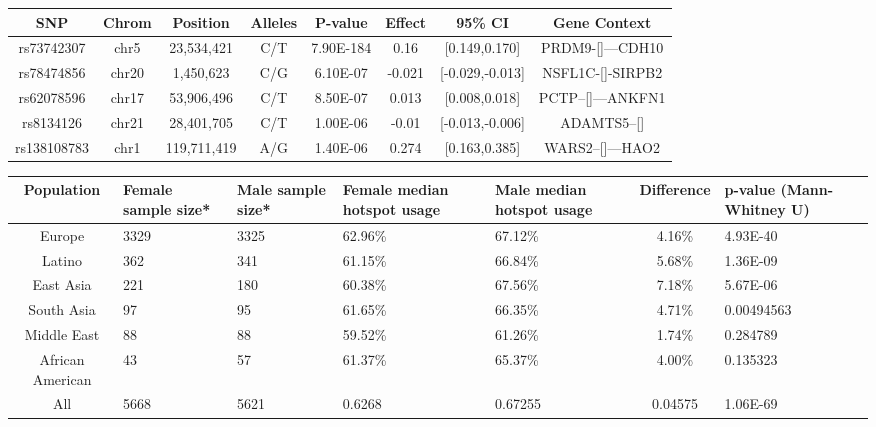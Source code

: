 \clearpage 

\mbox{} \vspace{3cm}
\begin{table}[h] \centering
    \footnotesize
    \begin{tabular}{|cccccccc|}
        \hline 
SNP & Chrom & Position & Alleles & P-value & Effect & 95\% CI & Gene Context \\ \hline
rs73742307 & chr5 & 23,534,421 & C/T & 7.90E-184 & 0.16 & [0.149,0.170] & PRDM9-[]---CDH10 \\
rs78474856 & chr20 & 1,450,623 & C/G & 6.10E-07 & -0.021 & [-0.029,-0.013] & NSFL1C-[]-SIRPB2 \\
rs62078596 & chr17 & 53,906,496 & C/T & 8.50E-07 & 0.013 & [0.008,0.018] & PCTP--[]---ANKFN1 \\
rs8134126 & chr21 & 28,401,705 & C/T & 1.00E-06 & -0.01 & [-0.013,-0.006] & ADAMTS5--[] \\
rs138108783 & chr1 & 119,711,419 & A/G & 1.40E-06 & 0.274 & [0.163,0.385] & WARS2--[]---HAO2 \\
    \hline \end{tabular}
\end{table}

\vspace{2cm}
\begin{table}[!h] \centering
    \begin{tabular}{|cp{1.5cm}p{1.5cm}p{1.5cm}p{1.5cm}cp{2cm}|}
        \hline 
        Population & Female sample size* & Male sample size* & Female median hotspot usage & Male median hotspot usage & Difference & p-value (Mann-Whitney U) \\ \hline
        Europe & 3329 & 3325 & 62.96\% & 67.12\% & 4.16\% & 4.93E-40 \\
        Latino & 362 & 341 & 61.15\% & 66.84\% & 5.68\% & 1.36E-09 \\
        East Asia & 221 & 180 & 60.38\% & 67.56\% & 7.18\% & 5.67E-06 \\
        South Asia & 97 & 95 & 61.65\% & 66.35\% & 4.71\% & 0.00494563 \\
        Middle East & 88 & 88 & 59.52\% & 61.26\% & 1.74\% & 0.284789 \\
        African American & 43 & 57 & 61.37\% & 65.37\% & 4.00\% & 0.135323 \\
        \hline All & 5668 & 5621 & 0.6268 & 0.67255 & 0.04575 & 1.06E-69 \\
    \hline \end{tabular}
\end{table}

